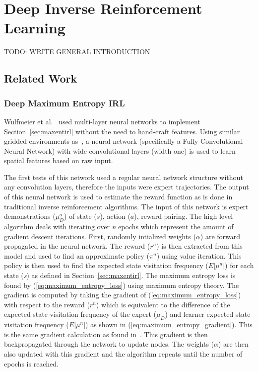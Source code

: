 \documentclass[12pt,american]{report}
\begin{document}
\chapter{Deep Inverse Reinforcement Learning}
TODO: WRITE GENERAL INTRODUCTION
\section{Related Work}
\label{sec:maxentdeepirl}
\subsection{Deep Maximum Entropy IRL}
Wulfmeier et al.~\cite{wulfmeier2015maximum} used multi-layer neural networks to implement Section~\ref{sec:maxentirl} without the need to hand-craft features. Using similar gridded environments as~\cite{ziebart2008maximum}, a neural network (specifically a Fully Convolutional Neural Network) with wide convolutional layers (width one) is used to learn spatial features based on raw input.  

The first tests of this network used a regular neural network structure without any convolution layers, therefore the inputs were expert trajectories. The output of this neural network is used to estimate the reward function as is done in traditional inverse reinforcement algorithms. The input of this network is expert demonstrations ($\mu_{D}^{a}$) of state ($s$), action ($a$), reward pairing. The high level algorithm deals with iterating over \textit{n} epochs which represent the amount of gradient descent iterations. First, randomly intialized weights ($\alpha$) are forward propagated in the neural network.  The reward ($r^n$) is then extracted from this model and used to find an approximate policy ($\pi^n$) using value iteration. This policy is then used to find the expected state visitation frequency ($E|\mu^n|$) for each state (\textit{s}) as defined in Section~\ref{sec:maxentirl}.  The maximum entropy loss is found by (\ref{eq:maximum_entropy_loss}) using maximum entropy theory. The gradient is computed by taking the gradient of (\ref{eq:maximum_entropy_loss}) with respect to the reward ($r^n$) which is equivalent to the difference of the expected state visitation frequency of the expert ($\mu_D$) and learner expected state visitation frequency ($E|\mu^n|$) as shown in (\ref{eq:maximum_entropy_gradient}).  This is the same gradient calculation as found in~\cite{ziebart2008maximum}.  This gradient is then backpropagated through the network to update nodes.  The weights ($\alpha$) are then also updated with this gradient and the algorithm repeats until the number of epochs is reached. 
\end{document}
